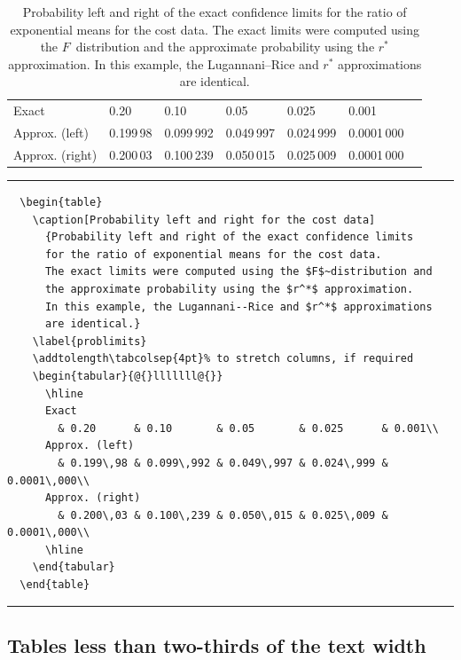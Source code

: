   \begin{table}
    \caption[Probability left and right for the cost data]
      {Probability left and right of the exact confidence limits
      for the ratio of exponential means for the cost data.
      The exact limits were computed using the $F$~distribution and
      the approximate probability using the $r^*$ approximation.
      In this example, the Lugannani--Rice and $r^*$ approximations
      are identical.}
    \label{problimits}
    \addtolength\tabcolsep{4pt}%
    \begin{tabular}{@{}lllllll@{}}
      \hline
      Exact
        & 0.20      & 0.10       & 0.05       & 0.025      & 0.001\\
      Approx. (left)
        & 0.199\,98 & 0.099\,992 & 0.049\,997 & 0.024\,999 & 0.0001\,000\\
      Approx. (right)
        & 0.200\,03 & 0.100\,239 & 0.050\,015 & 0.025\,009 & 0.0001\,000\\
      \hline
    \end{tabular}
\rule[-20pt]{\textwidth}{0.5pt}
\begin{verbatim}
  \begin{table}
    \caption[Probability left and right for the cost data]
      {Probability left and right of the exact confidence limits
      for the ratio of exponential means for the cost data.
      The exact limits were computed using the $F$~distribution and
      the approximate probability using the $r^*$ approximation.
      In this example, the Lugannani--Rice and $r^*$ approximations
      are identical.}
    \label{problimits}
    \addtolength\tabcolsep{4pt}% to stretch columns, if required
    \begin{tabular}{@{}lllllll@{}}
      \hline
      Exact
        & 0.20      & 0.10       & 0.05       & 0.025      & 0.001\\
      Approx. (left)
        & 0.199\,98 & 0.099\,992 & 0.049\,997 & 0.024\,999 & 0.0001\,000\\
      Approx. (right)
        & 0.200\,03 & 0.100\,239 & 0.050\,015 & 0.025\,009 & 0.0001\,000\\
      \hline
    \end{tabular}
  \end{table}
\end{verbatim}
\rule[20pt]{\textwidth}{0.5pt}
\end{table}

\subsection{Tables less than two-thirds of the text width}

